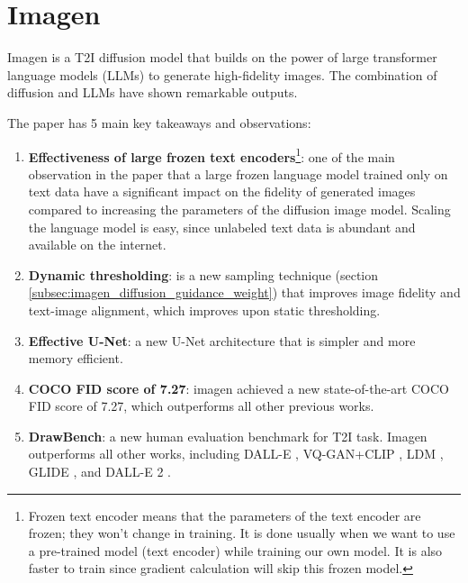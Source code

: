 \section{Imagen}
\label{sec:imagen}

Imagen \cite{imagen} is a T2I diffusion model that builds on the power of large transformer language models \cite{transformer} (LLMs) to generate high-fidelity images. The combination of diffusion and LLMs have shown remarkable outputs. 

The paper has 5 main key takeaways and observations:

\begin{enumerate}
    \item \textbf{Effectiveness of large frozen text encoders}\footnote{Frozen text encoder means that the parameters of the text encoder are frozen; they won't change in training. It is done usually when we want to use a pre-trained model (text encoder) while training our own model. It is also faster to train since gradient calculation will skip this frozen model.}: one of the main observation in the paper that a large frozen language model trained only on text data have a significant impact on the fidelity of generated images compared to increasing the parameters of the diffusion image model. Scaling the language model is easy, since unlabeled text data is abundant and available on the internet.
    \item \textbf{Dynamic thresholding}: is a new sampling technique (section \ref{subsec:imagen_diffusion_guidance_weight}) that improves image fidelity and text-image alignment, which improves upon static thresholding.
    \item \textbf{Effective U-Net}: a new U-Net architecture that is simpler and more memory efficient.
    \item \textbf{COCO FID score of 7.27}: imagen achieved a new state-of-the-art COCO FID score of 7.27, which outperforms all other previous works.
    \item \textbf{DrawBench}: a new human evaluation benchmark for T2I task. Imagen outperforms all other works, including DALL-E \cite{dalle}, VQ-GAN+CLIP \cite{vqgan_clip}, LDM \cite{stable_diffusion}, GLIDE \cite{glide}, and DALL-E 2 \cite{dalle_2}.
\end{enumerate}



















